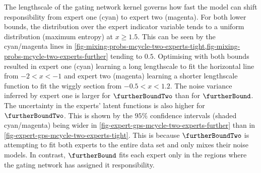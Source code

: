 \documentclass{mimosis-class/mimosis}
\numberwithin{equation}{chapter}
\begin{document}
{The lengthscale of the gating network kernel governs how fast the model can shift responsibility from
expert one (cyan) to expert two (magenta).
For both lower bounds,
the distribution over the expert indicator variable tends to a uniform distribution (maximum entropy)
at \(x \geq 1.5\).
This can be seen by the cyan/magenta lines in
\cref{fig-mixing-probs-mcycle-two-experts-tight,fig-mixing-probs-mcycle-two-experts-further} tending to \(0.5\).
Optimising with both bounds resulted in expert one (cyan) learning a
long lengthscale to fit the horizontal line from \(-2<x<-1\) and
expert two (magenta) learning a shorter lengthscale function to fit the wiggly section from \(-0.5<x<1.2\).
The noise variance inferred by expert one is larger for \(\furtherBoundTwo\) than for \(\furtherBound\).
The uncertainty in the experts' latent functions is also higher for \(\furtherBoundTwo\).
This is shown by the \(95\%\) confidence intervals (shaded cyan/magenta) being wider in
\cref{fig-expert-gps-mcycle-two-experts-further} than in \cref{fig-expert-gps-mcycle-two-experts-tight}.
This is because \(\furtherBoundTwo\) is attempting to fit both experts to the entire data set and only
mixes their noise models.
In contrast, \(\furtherBound\) fits each expert only in the regions where the gating network has
assigned it responsibility.

}
\end{document}
